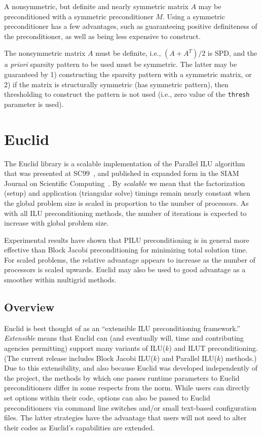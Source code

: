 A nonsymmetric, but definite and nearly symmetric matrix $A$ 
may be preconditioned
with a symmetric preconditioner $M$.  Using a symmetric preconditioner
has a few advantages, such as guaranteeing positive
definiteness of the preconditioner, as well as being less expensive
to construct.

The nonsymmetric matrix $A$ must be definite,
i.e., $(A+A^T)/2$ is SPD, and the {\em a priori} sparsity pattern to be used
must be symmetric.  The latter may be guaranteed by 1) 
constructing the sparsity pattern with a symmetric matrix, or 2) if the
matrix is structurally symmetric (has symmetric pattern), then
thresholding to construct the pattern is not used (i.e.,
zero value of the {\tt thresh} parameter is used).


\section{Euclid}

The Euclid library is a scalable implementation of the Parallel ILU algorithm
that was presented at SC99~\cite{DHysom_APothen_1999}, and published in
expanded form in the SIAM Journal on Scientific
Computing~\cite{DHysom_APothen_2001}.  By {\em scalable} we mean that the
factorization (setup) and application (triangular solve) timings remain nearly
constant when the global problem size is scaled in proportion to the number of
processors.  As with all ILU preconditioning methods, the number of iterations
is expected to increase with global problem size.

Experimental results have shown that PILU preconditioning is in general
more effective than Block Jacobi preconditioning 
for minimizing total solution time.
For scaled problems, the relative advantage appears to increase 
as the number of processors is scaled upwards.
Euclid may also be used to good advantage as a smoother within 
multigrid methods.


\subsection{Overview}

Euclid is best thought of as an ``extensible ILU preconditioning
framework.''
{\em Extensible} means that Euclid can (and eventually will, time and
contributing agencies permitting) support many variants of ILU($k$)
and ILUT preconditioning.
(The current release includes Block Jacobi ILU($k$) and
Parallel ILU($k$) methods.)
Due to this extensibility, and also because Euclid was developed 
independently of the \hypre{} project, the methods by which one
passes runtime parameters to Euclid preconditioners
differ in some respects from the \hypre{} norm.
While users can directly set options within their code,
options can also be passed to Euclid preconditioners via
command line switches and/or small text-based configuration files.
The latter strategies have the advantage that users will not need to
alter their codes as Euclid's capabilities are extended.

